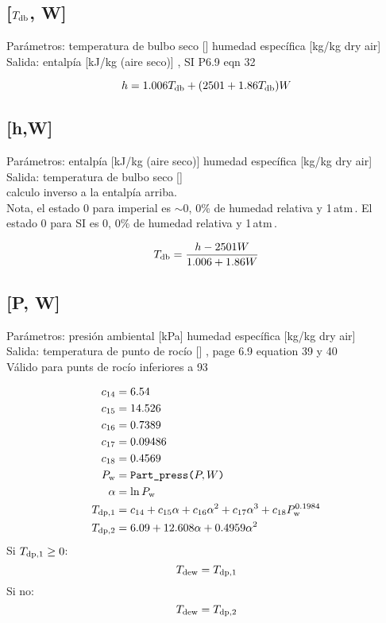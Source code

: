 \documentclass[letterpaper]{article}
\newcommand*\Tdb{\ensuremath{T\sub{db}}}
\newcommand*\Tdp{\ensuremath{T\sub{dew}}}
\newcommand*\Pw{\ensuremath{P\sub{w}}}
\begin{document}
\subsection{[\Tdb, W]}
\noindent Parámetros:
\vardef{\Tdb}temperatura de bulbo seco [\degC]
humedad específica [kg/kg dry air]
\\Salida:
entalpía [kJ/kg (aire seco)]
\ashref, SI P6.9 eqn 32

\begin{equation}
    h = 1.006\Tdb + (2501 + 1.86\Tdb)W
\end{equation}


\subsection{[h,W]}
\noindent Parámetros:
entalpía [kJ/kg (aire seco)]
humedad específica [kg/kg dry air]
\\Salida:
\vardef{\Tdb}temperatura de bulbo seco [\degC]
\\calculo inverso a la entalpía arriba.
\\Nota, el estado 0 para imperial es $\sim0$\degF, 0\% de humedad relativa y 1\,atm\,.
El estado 0 para SI es 0\degC, 0\% de humedad relativa y 1\,atm\,.

\begin{equation}
	\Tdb = \frac{h-2501W}{1.006+1.86W}
\end{equation}
    

\subsection{[P, W]}
\noindent Parámetros:
presión ambiental [kPa]
humedad específica [kg/kg dry air]
\\Salida:
\vardef{\Tdp}temperatura de punto de rocío [\degC]
\ashref, page 6.9 equation 39 y 40
\\Válido para punts de rocío inferiores a 93\degC

\begin{align}
    c_{14} &= 6.54 \\
    c_{15} &= 14.526 \\
    c_{16} &= 0.7389 \\
    c_{17} &= 0.09486 \\
    c_{18} &= 0.4569 \\
    \Pw &= \funcname{Part\_press}[P, W] \\
    \alpha &= \ln\Pw \\
    T\sub[1]{dp} &= c_{14} + c_{15}\alpha + c_{16}\alpha^2 + c_{17}\alpha^3 + c_{18}\Pw^{0.1984} \\
    T\sub[2]{dp} &= 6.09 + 12.608\alpha + 0.4959\alpha^2
\end{align}
Si $T\sub[1]{dp}\ge0$:
\begin{equation}
	\Tdp=T\sub[1]{dp}
\end{equation}
Si no:
\begin{equation}
	\Tdp=T\sub[2]{dp}
\end{equation}
\end{document}
